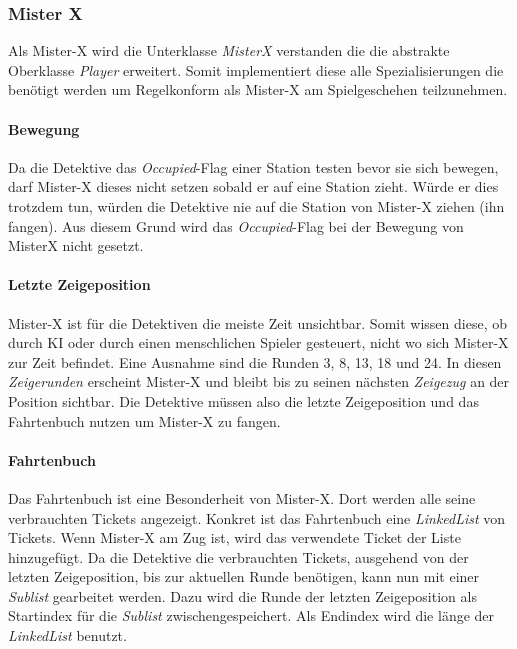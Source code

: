             \subsubsection{Mister X}
                Als Mister-X wird die Unterklasse \textit{MisterX} verstanden die die abstrakte Oberklasse \textit{Player} erweitert.
                Somit implementiert diese alle Spezialisierungen die benötigt werden um Regelkonform als Mister-X am Spielgeschehen teilzunehmen.

                \paragraph{Bewegung}
                    Da die Detektive das \textit{Occupied}-Flag einer Station testen bevor sie sich bewegen,
                    darf Mister-X dieses nicht setzen sobald er auf eine Station zieht.
                    Würde er dies trotzdem tun, würden die Detektive nie auf die Station von Mister-X ziehen (ihn fangen).
                    Aus diesem Grund wird das \textit{Occupied}-Flag bei der Bewegung von MisterX nicht gesetzt.

                \paragraph{Letzte Zeigeposition}
                    Mister-X ist für die Detektiven die meiste Zeit unsichtbar.
                    Somit wissen diese, ob durch KI oder durch einen menschlichen Spieler gesteuert, nicht wo sich Mister-X zur Zeit befindet.
                    Eine Ausnahme sind die Runden 3, 8, 13, 18 und 24. In diesen \textit{Zeigerunden} erscheint Mister-X und bleibt bis zu 
                    seinen nächsten \textit{Zeigezug} an der Position sichtbar.
                    Die Detektive müssen also die letzte Zeigeposition und das Fahrtenbuch nutzen um Mister-X zu fangen.

                \paragraph{Fahrtenbuch}
                    Das Fahrtenbuch ist eine Besonderheit von Mister-X. Dort werden alle seine verbrauchten Tickets angezeigt.
                    \newline
                    Konkret ist das Fahrtenbuch eine \textit{LinkedList} von Tickets. Wenn Mister-X am Zug ist, wird das verwendete Ticket der Liste hinzugefügt.
                    Da die Detektive die verbrauchten Tickets, ausgehend von der letzten Zeigeposition, bis zur aktuellen Runde benötigen,
                    kann nun mit einer \textit{Sublist} gearbeitet werden.
                    Dazu wird die Runde der letzten Zeigeposition als Startindex für die \textit{Sublist} zwischengespeichert.
                    Als Endindex wird die länge der \textit{LinkedList} benutzt.

